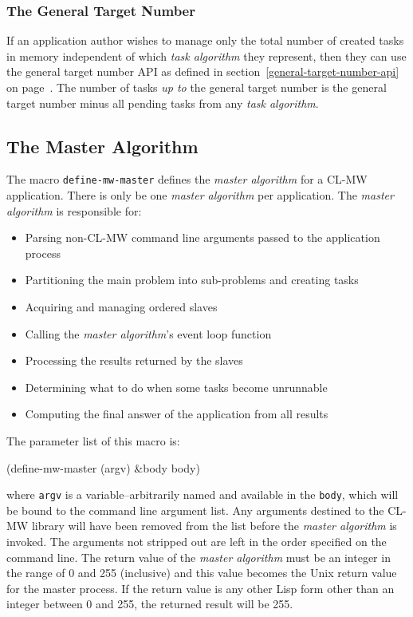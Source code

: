 \documentclass[titlepage,12pt]{book}
\newcommand{\xsmall}{\latexhtml{\small}{}}
\newcommand{\xnormalsize}{\latexhtml{\normalsize}{}}
\newcommand{\clmw}{\xsmall\textsc{CL-MW}\xnormalsize\xspace}
\newcommand{\ma}{\textit{master algorithm}\xspace}
\newcommand{\ta}{\textit{task algorithm}\xspace}
\newcommand{\macro}[1]{\mbox{\texttt{#1}}\xspace}
\newcommand{\var}[1]{\texttt{#1}\xspace}
\begin{document}
\subsubsection{The General Target Number}

If an application author wishes to manage only the total
number of created tasks in memory independent of which \ta
they represent, then they can use the general target number
API as defined in section~\ref{general-target-number-api} on
page~\pageref{general-target-number-api}.  The number of tasks
\textit{up to} the general target number is the general target number
minus all pending tasks from any \ta.

\subsection{\label{master-algorithm}The Master Algorithm}

The macro \macro{define-mw-master} defines the \ma for a \clmw
application. There is only be one \ma per application. The \ma is
responsible for:

\begin{itemize}
\item Parsing non-\clmw command line arguments passed to the application process
\item Partitioning the main problem into sub-problems and creating tasks
\item Acquiring and managing ordered slaves
\item Calling the {\ma}'s event loop function
\item Processing the results returned by the slaves
\item Determining what to do when some tasks become unrunnable
\item Computing the final answer of the application from all results
\end{itemize}

The parameter list of this macro is:

\begin{barelisp}
(define-mw-master (argv) &body body)
\end{barelisp}

where \var{argv} is a variable--arbitrarily named and available in
the \var{body}, which will be bound to the command line argument
list. Any arguments destined to the \clmw library will have been
removed from the list before the \ma is invoked.  The arguments not
stripped out are left in the order specified on the command line.
The return value of the \ma must be an integer in the range of 0 and
255 (inclusive) and this value becomes the Unix return value for the
master process. If the return value is any other Lisp form other than
an integer between 0 and 255, the returned result will be 255.
\end{document}
